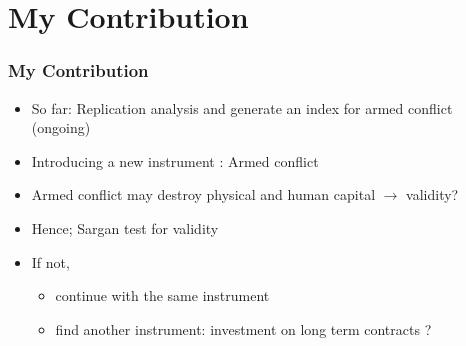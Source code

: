 \documentclass{beamer}
\begin{document}
\section{My Contribution} 
\begin{frame}
\frametitle{My Contribution} 
\begin{itemize}
\item So far: Replication analysis and generate an index for armed conflict (ongoing)
\item Introducing a new instrument : Armed conflict
\item Armed conflict may destroy physical and human capital $\rightarrow$ validity?
\item Hence; Sargan test for validity
\item If not, 
\begin{itemize}
\item continue with the same instrument
\item find another instrument: investment on long term contracts ?
\end{itemize}
\end{itemize}
\end{frame}
\end{document}
